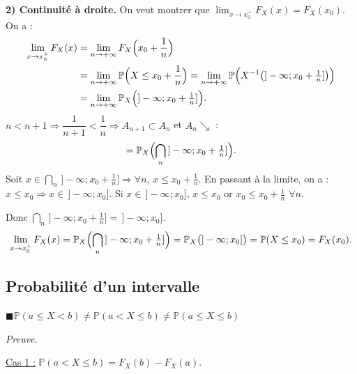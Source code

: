 \documentclass[11pt,a4paper]{article}
\newcommand{\PP}{\mathbb{P}}
\begin{document}
\begin{center}
\end{center}

\textbf{\color{bleu}2) Continuité à droite.}
On veut montrer que $\displaystyle\lim_{x\to x_0^+}F_X(x)=F_X(x_0)$. On a :
\begin{align*}
  \lim_{x\to x_0^+}F_X(x)&=\lim_{n\to+\infty}F_X\Bigl(x_0+\frac1n\Bigr)\\
  &=\lim_{n\to+\infty}\PP\Bigl(X\le x_0+\frac1n\Bigr)=\lim_{n\to+\infty}\PP\Bigl(X^{-1}\bigl(]-\infty;x_0+\tfrac1n]\bigr)\Bigr)\\
  &=\lim_{n\to+\infty}\PP_X\Bigl(]-\infty;x_0+\tfrac1n]\Bigr).
\end{align*}
$n<n+1\Rightarrow\dfrac1{n+1}<\dfrac1n\Rightarrow A_{n+1}\subset A_n$ et $A_n\searrow$ :
\[
  =\PP_X\Bigl(\bigcap_{n}\,]-\infty;x_0+\tfrac1n]\Bigr).
\]
Soit $x\in\bigcap_n\,]-\infty;x_0+\frac1n]\Rightarrow\forall n$, $x\le x_0+\frac1n$. En passant à la limite, on a : $x\le x_0\Rightarrow x\in\,]-\infty;x_0]$.
Si $x\in\,]-\infty;x_0]$, $x\le x_0$ or $x_0\le x_0+\frac1n$ $\forall n$.

Donc $\displaystyle\bigcap_{n}\,]-\infty;x_0+\tfrac1n]=\,]-\infty;x_0]$.
\[
  \lim_{x\to x_0^+}F_X(x)=\PP_X\Bigl(\bigcap_n\,]-\infty;x_0+\tfrac1n]\Bigr)=\PP_X\bigl(]-\infty;x_0]\bigr)=\PP(X\le x_0)=F_X(x_0).
\]

\subsection*{Probabilité d'un intervalle}

$\blacksquare$\quad $\PP(a\le X<b)\neq\PP(a<X\le b)\neq\PP(a\le X\le b)$

\textit{Preuve.}

\underline{Cas 1 :} $\PP(a<X\le b)=F_X(b)-F_X(a)$.
\end{document}
